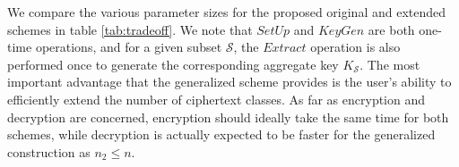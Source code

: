 We compare the various parameter sizes for the proposed original and extended schemes in table \ref{tab:tradeoff}. We note that $SetUp$ and $KeyGen$ are both one-time operations, and for a given subset $\mathcal{S}$, the $Extract$ operation is also performed once to generate the corresponding aggregate key $K_{\mathcal{S}}$. The most important advantage that the generalized scheme provides is the user's ability to efficiently extend the number of ciphertext classes. As far as encryption and decryption are concerned, encryption should ideally take the same time for both schemes, while decryption is actually expected to be faster for the generalized construction as $n_2\leq n$.  

\begin{table}[!t]
\captionsetup{font=scriptsize}
\caption{Comparison between the Basic and Generalized schemes}
\label{tab:tradeoff}
\begin{center}

\end{center}
\end{table}


